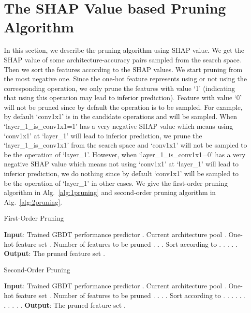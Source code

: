 \documentclass{article}
\begin{document}
\setcounter{section}{0}

\section{The SHAP Value based Pruning Algorithm}
In this section, we describe the pruning algorithm using SHAP value. We get the SHAP value of some architecture-accuracy pairs sampled from the search space. Then we sort the features according to the SHAP values. We start pruning from the most negative one. Since the one-hot feature represents using or not using the corresponding operation, we only prune the features with value `1' (indicating that using this operation may lead to inferior prediction). Feature with value `0' will not be pruned since by default the operation is to be sampled. For example, by default `conv1x1' is in the candidate operations and will be sampled. When `layer\_1\_is\_conv1x1=1' has a very negative SHAP value which means using `conv1x1' at `layer\_1' will lead to inferior prediction, we prune the `layer\_1\_is\_conv1x1' from the search space and `conv1x1' will not be sampled to be the operation of `layer\_1'. However, when `layer\_1\_is\_conv1x1=0' has a very negative SHAP value which means not using `conv1x1' at `layer\_1' will lead to inferior prediction, we do nothing since by default `conv1x1' will be sampled to be the operation of `layer\_1' in other cases. We give the first-order pruning algorithm in Alg.~\ref{alg:1pruning} and second-order pruning algorithm in Alg.~\ref{alg:2pruning}.

\begin{algorithm}[ht]
\small
\caption{First-Order Pruning}
\label{alg:1pruning}
\begin{algorithmic}[1]
\STATE \textbf{Input}: Trained GBDT performance predictor . Current architecture pool . One-hot feature set . Number of features to be pruned .
\STATE .
\STATE .
\STATE Sort  according to .
\FOR {}
\STATE .
\STATE .
\STATE .
\IF{}
\STATE .
\ENDIF
\ENDFOR
\STATE \textbf{Output}: The pruned feature set .
\end{algorithmic}
\end{algorithm}

\begin{algorithm}[ht]
\small
\caption{Second-Order Pruning}
\label{alg:2pruning}
\begin{algorithmic}[1]
\STATE \textbf{Input}: Trained GBDT performance predictor . Current architecture pool . One-hot feature set . Number of features to be pruned .
\STATE .
\STATE .
\STATE .
\STATE Sort  according to .
\FOR {}
\STATE .
\STATE .
\STATE .
\STATE .
\STATE .
\STATE .
\STATE .
\IF{}
\STATE .
\ELSIF{}
\STATE .
\ELSIF{}
\STATE .
\ENDIF
\ENDFOR
\STATE \textbf{Output}: The pruned feature set .
\end{algorithmic}
\end{algorithm}
\end{document}
